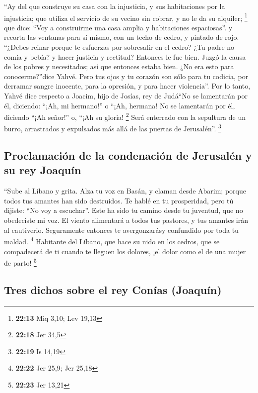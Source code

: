 \begin{paracol}{2}
 ``Ay del que construye su casa con la injusticia, y sus
habitaciones por la injusticia; que utiliza el servicio de su vecino sin
cobrar, y no le da su alquiler; \footnote{\textbf{22:13} Miq 3,10; Lev
  19,13}  que dice: ``Voy a construirme una casa amplia y
habitaciones espaciosas''. y recorta las ventanas para sí mismo, con un
techo de cedro, y pintado de rojo.  ``¿Debes reinar
porque te esfuerzas por sobresalir en el cedro? ¿Tu padre no comía y
bebía? y hacer justicia y rectitud? Entonces le fue bien.
 Juzgó la causa de los pobres y necesitados; así que
entonces estaba bien. ¿No era esto para conocerme?''dice Yahvé.
 Pero tus ojos y tu corazón son sólo para tu codicia, por
derramar sangre inocente, para la opresión, y para hacer violencia''.
 Por lo tanto, Yahvé dice respecto a Joacim, hijo de
Josías, rey de Judá``No se lamentarán por él, diciendo: ``¡Ah, mi
hermano!'' o ``¡Ah, hermana! No se lamentarán por él, diciendo ``¡Ah
señor!'' o, ``¡Ah su gloria! \footnote{\textbf{22:18} Jer 34,5}
 Será enterrado con la sepultura de un burro, arrastrados
y expulsados más allá de las puertas de Jerusalén''. \footnote{\textbf{22:19}
  Is 14,19}

\hypertarget{proclamaciuxf3n-de-la-condenaciuxf3n-de-jerusaluxe9n-y-su-rey-joaquuxedn}{%
\subsection{Proclamación de la condenación de Jerusalén y su rey
Joaquín}\label{proclamaciuxf3n-de-la-condenaciuxf3n-de-jerusaluxe9n-y-su-rey-joaquuxedn}}

 ``Sube al Líbano y grita. Alza tu voz en Basán, y claman
desde Abarim; porque todos tus amantes han sido destruidos.
 Te hablé en tu prosperidad, pero tú dijiste: ``No voy a
escuchar''. Este ha sido tu camino desde tu juventud, que no obedeciste
mi voz.  El viento alimentará a todos tus pastores, y tus
amantes irán al cautiverio. Seguramente entonces te avergonzarásy
confundido por toda tu maldad. \footnote{\textbf{22:22} Jer 25,9; Jer
  25,18}  Habitante del Líbano, que hace su nido en los
cedros, que se compadecerá de ti cuando te lleguen los dolores, ¡el
dolor como el de una mujer de parto! \footnote{\textbf{22:23} Jer 13,21}

\hypertarget{tres-dichos-sobre-el-rey-conuxedas-joaquuxedn}{%
\subsection{Tres dichos sobre el rey Conías
(Joaquín)}\label{tres-dichos-sobre-el-rey-conuxedas-joaquuxedn}}


\end{paracol}
